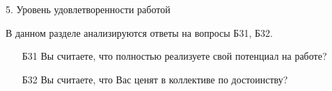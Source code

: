 \begin{frame}{5. Уровень удовлетворенности работой}

\tiny

В данном разделе анализируются ответы на вопросы Б31, Б32.
\bigskip

\begin{itemize}

\item [Б31] Вы считаете, что полностью реализуете свой потенциал на работе?

\item [Б32] Вы считаете, что Вас ценят в коллективе по достоинству?

\end{itemize}

\end{frame}


